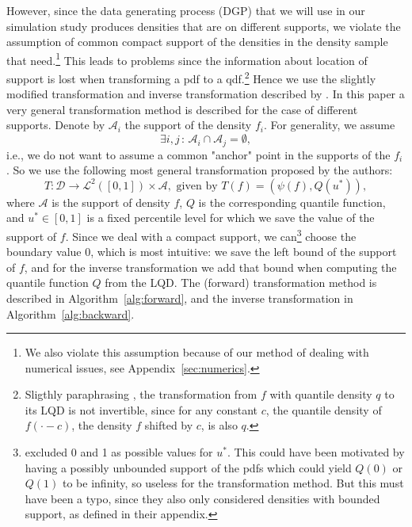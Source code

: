 However, since the data generating process (DGP) that we will use in our simulation study
produces densities that are on different supports, we violate the assumption of common
compact support of the densities in the density sample that \textcite{PetersenMüller2016}
need.\footnote{We also violate this assumption because of our method of dealing with
numerical issues, see Appendix~\ref{sec:numerics}.} This leads to problems since the information
about location of support is lost when transforming a pdf to a qdf.\footnote{Sligthly
paraphrasing \textcite{KokoszkaEtAl2019}, the transformation from $f$ with quantile
density $q$ to its LQD is not invertible, since for any constant $c$, the quantile density of
$f(\cdot - c)$, the density $f$ shifted by $c$, is also $q$.}
Hence we use the slightly modified transformation and inverse transformation described
by \textcite{KokoszkaEtAl2019}. In this paper a very general transformation method is
described for the case of different supports. Denote by $\mathcal{A}_i$ the support of
the density $f_i$. For generality, we assume
\begin{equation*}
    \exists i, j \, : \, \mathcal{A}_i \cap \mathcal{A}_j = \emptyset,
\end{equation*}
i.e., we do not want to assume a common "anchor" point in the supports of the $f_i$. So
we use the following most general transformation proposed by the authors:
\begin{equation}
    T : \mathcal{D} \to \mathcal{L}^2([0,1]) \times \mathcal{A}, \text{ given by } T(f) = (\psi(f), Q(u^*)),
\end{equation}
where $\mathcal{A}$ is the support of density $f$, $Q$ is the corresponding quantile function,
and $u^* \in [0,1]$ is a fixed percentile level for which we save the value of the support
of $f$. Since we deal with a compact support, we can\footnote{\textcite{KokoszkaEtAl2019}
excluded 0 and 1 as possible values for $u^*$. This could have been motivated by having
a possibly unbounded support of the pdfs which could yield $Q(0)$ or $Q(1)$ to be
infinity, so useless for the transformation method. But this must have been a typo,
since they also only considered densities with bounded support, as defined in their
appendix.} choose the boundary value 0, which is most intuitive: we save the left bound
of the support of $f$, and for the inverse transformation we add that bound when computing
the quantile function $Q$ from the LQD. The (forward) transformation method is described
in Algorithm~\ref{alg:forward}, and the inverse transformation in Algorithm~\ref{alg:backward}.

